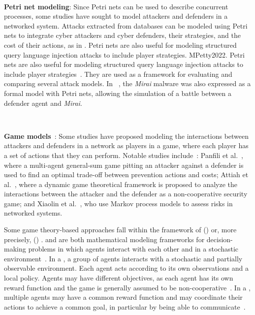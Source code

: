 \

\noindent
\textbf{Petri net modeling}: Since Petri nets can be used to describe concurrent processes, some studies have sought to model attackers and defenders in a networked system.
Attacks extracted from databases can be modeled using Petri nets to integrate cyber attackers and cyber defenders, their strategies, and the cost of their actions, as in \cite{MPetty2022}. Petri nets are also useful for modeling structured query language injection attacks to include player strategies. {MPetty2022}. Petri nets are also useful for modeling structured query language injection attacks to include player strategies~\cite {JBland2020}.
They are used as a framework for evaluating and comparing several attack models.
In ~\cite{SYamaguchi2020}, the \textit{Mirai} malware was also expressed as a formal model with Petri nets, allowing the simulation of a battle between a defender agent and \textit{Mirai}.

\

\noindent
\textbf{Game models}~: \quad Some studies have proposed modeling the interactions between attackers and defenders in a network as players in a game, where each player has a set of actions that they can perform.
Notable studies include~: Panfili et al.~\cite{MPanfili2018}, where a multi-agent general-sum game pitting an attacker against a defender is used to find an optimal trade-off between prevention actions and costs; Attiah et al.~\cite {AAttiah2018}, where a dynamic game theoretical framework is proposed to analyze the interactions between the attacker and the defender as a non-cooperative security game; and Xiaolin et al.~\cite{CXiaolin2008}, who use Markov process models to assess risks in networked systems.

\noindent
Some game theory-based approaches fall within the framework of  () or, more precisely,  () .  and  are both mathematical modeling frameworks for decision-making problems in which agents interact with each other and in a stochastic environment~\cite {beynier2010}. In a , a group of agents interacts with a stochastic and partially observable environment. Each agent acts according to its own observations and a local policy. Agents may have different objectives, as each agent has its own reward function and the game is generally assumed to be non-cooperative~\cite{terry2020pettingzoo}. In a , multiple agents may have a common reward function and may coordinate their actions to achieve a common goal, in particular by being able to communicate~\cite{bernstein2013}.



